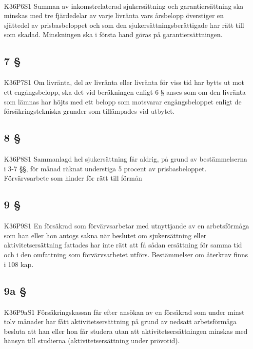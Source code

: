 \documentclass[a4paper,notitlepage,openany,10pt]{book}
\begin{document}
\paragraph*{}
{\tiny K36P6S1}
Summan av inkomstrelaterad sjukersättning och garantiersättning ska minskas med tre fjärdedelar av varje livränta vars årsbelopp överstiger en sjättedel av prisbasbeloppet och som den sjukersättningsberättigade har rätt till som skadad. Minskningen ska i första hand göras på garantiersättningen.
\subsection*{7 §}
\paragraph*{}
{\tiny K36P7S1}
Om livränta, del av livränta eller livränta för viss tid har bytts ut mot ett engångsbelopp, ska det vid beräkningen enligt 6 § anses som om den livränta som lämnas har höjts med ett belopp som motsvarar engångsbeloppet enligt de försäkringstekniska grunder som tillämpades vid utbytet.
\subsection*{8 §}
\paragraph*{}
{\tiny K36P8S1}
Sammanlagd hel sjukersättning får aldrig, på grund av bestämmelserna i 3-7 §§, för månad räknat understiga 5 procent av prisbasbeloppet.
Förvärvsarbete som hinder för rätt till förmån
\subsection*{9 §}
\paragraph*{}
{\tiny K36P9S1}
En försäkrad som förvärvsarbetar med utnyttjande av en arbetsförmåga som han eller hon antogs sakna när beslutet om sjukersättning eller aktivitetsersättning fattades har inte rätt att få sådan ersättning för samma tid och i den omfattning som förvärvsarbetet utförs. Bestämmelser om återkrav finns i 108 kap.
\subsection*{9a §}
\paragraph*{}
{\tiny K36P9aS1}
Försäkringskassan får efter ansökan av en försäkrad som under minst tolv månader har fått aktivitetsersättning på grund av nedsatt arbetsförmåga besluta att han eller hon får studera utan att aktivitetsersättningen minskas med hänsyn till studierna (aktivitetsersättning under prövotid).
\end{document}
